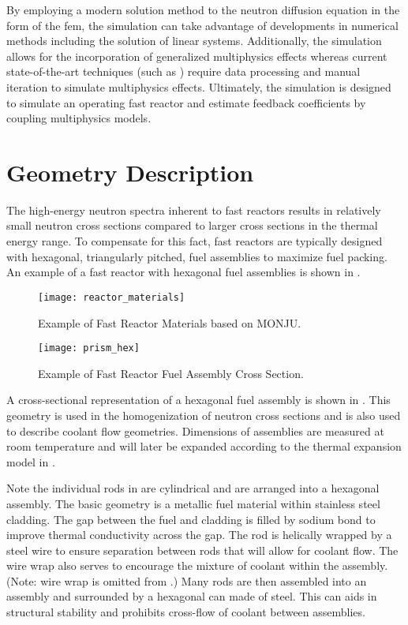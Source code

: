   By employing a modern solution method to the neutron diffusion equation in the
  form of the \gls{fem}, the simulation can take advantage of developments in
  numerical methods including the solution of linear systems. Additionally, the
  simulation allows for the incorporation of generalized multiphysics effects
  whereas current state-of-the-art techniques (such as \dif) require data
  processing and manual iteration to simulate multiphysics effects. Ultimately, 
  the simulation is designed to simulate an operating fast reactor and estimate
  feedback coefficients by coupling multiphysics models.

\section{Geometry Description}
  \label{sec:geometry_description}
  The high-energy neutron spectra inherent to fast reactors results in
  relatively small neutron cross sections compared to larger cross sections in
  the thermal energy range. To compensate for this fact, fast reactors are
  typically designed with hexagonal, triangularly pitched, fuel assemblies to
  maximize fuel packing. An example of a fast reactor with hexagonal fuel
  assemblies is shown in .
  
  \begin{figure}
    \centering
    \texttt{[image: reactor\_materials]}
    \caption{Example of Fast Reactor Materials based on MONJU.}
    \label{fig:reactor_materials}
  \end{figure}

  \begin{figure}
    \centering
    \texttt{[image: prism\_hex]}
    \caption{Example of Fast Reactor Fuel Assembly Cross Section.}
    \label{fig:prism_hex}
  \end{figure}

  A cross-sectional representation of a hexagonal fuel assembly is shown in
  . This geometry is used in the homogenization of neutron
  cross sections and is also used to describe coolant flow geometries.
  Dimensions of assemblies are measured at room temperature and will later be
  expanded according to the thermal expansion model in
  .

  Note the individual rods in  are cylindrical and are
  arranged into a hexagonal assembly. The basic geometry is a metallic fuel
  material within stainless steel cladding. The gap between the fuel and
  cladding is filled by sodium bond to improve thermal conductivity across the
  gap. The rod is helically wrapped by a steel wire to ensure separation between
  rods that will allow for coolant flow. The wire wrap also serves to encourage
  the mixture of coolant within the assembly. (Note: wire wrap is omitted from
  .) Many rods are then assembled into an assembly and
  surrounded by a hexagonal can made of steel. This can aids in structural
  stability and prohibits cross-flow of coolant between assemblies. 

